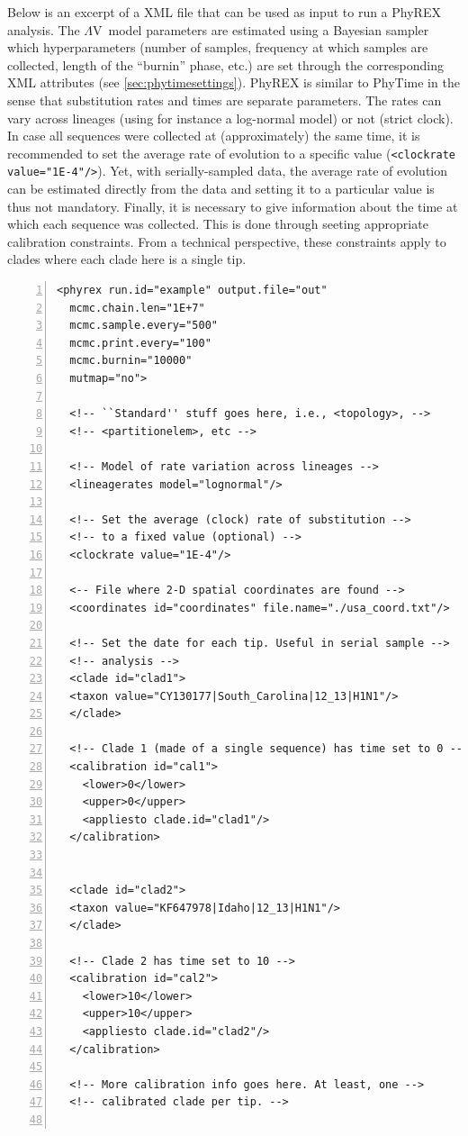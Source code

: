 \documentclass[a4paper,12pt]{article}
\newcommand{\x}[1]{\texttt{#1}}
\newcommand{\sfv}{$\Lambda$V}
\begin{document}
Below is an excerpt of a XML file that can be used as input to run a PhyREX analysis. The \sfv\
model parameters are estimated using a Bayesian sampler which hyperparameters (number of
samples, frequency at which samples are collected, length of the ``burnin'' phase, etc.) are set
through the corresponding XML attributes (see \ref{sec:phytimesettings}). PhyREX is similar to
PhyTime in the sense that substitution rates and times are separate parameters. The rates can
vary across lineages (using for instance a log-normal model) or not (strict clock). In case all
sequences were collected at (approximately) the same time, it is recommended to set the average
rate of evolution to a specific value (\x{<clockrate value="1E-4"/>}). Yet, with serially-sampled
data, the average rate of evolution can be estimated directly from the data and setting it to
a particular value is thus not mandatory. Finally, it is necessary to give information about the
time at which each sequence was collected. This is done through seeting appropriate calibration
constraints. From a technical perspective, these constraints apply to clades where each clade here
is a single tip.


\begin{Verbatim}[frame=single, label=Example (excerpt) of PhyREX XML file, samepage=true, baselinestretch=0.5,
  fontsize=\small, numbers=left]
  <phyrex run.id="example" output.file="out"
  mcmc.chain.len="1E+7"
  mcmc.sample.every="500"
  mcmc.print.every="100"
  mcmc.burnin="10000"
  mutmap="no">
  
  <!-- ``Standard'' stuff goes here, i.e., <topology>, -->
  <!-- <partitionelem>, etc -->
  
  <!-- Model of rate variation across lineages -->
  <lineagerates model="lognormal"/>
  
  <!-- Set the average (clock) rate of substitution -->
  <!-- to a fixed value (optional) -->
  <clockrate value="1E-4"/>

  <-- File where 2-D spatial coordinates are found --> 
  <coordinates id="coordinates" file.name="./usa_coord.txt"/>

  <!-- Set the date for each tip. Useful in serial sample -->
  <!-- analysis -->
  <clade id="clad1">
  <taxon value="CY130177|South_Carolina|12_13|H1N1"/>
  </clade>

  <!-- Clade 1 (made of a single sequence) has time set to 0 -->
  <calibration id="cal1">
    <lower>0</lower>
    <upper>0</upper>
    <appliesto clade.id="clad1"/>
  </calibration>

  
  <clade id="clad2">
  <taxon value="KF647978|Idaho|12_13|H1N1"/>
  </clade>
  
  <!-- Clade 2 has time set to 10 -->
  <calibration id="cal2">
    <lower>10</lower>
    <upper>10</upper>
    <appliesto clade.id="clad2"/>
  </calibration>
  
  <!-- More calibration info goes here. At least, one -->
  <!-- calibrated clade per tip. -->  
  
\end{Verbatim}
\end{document}
